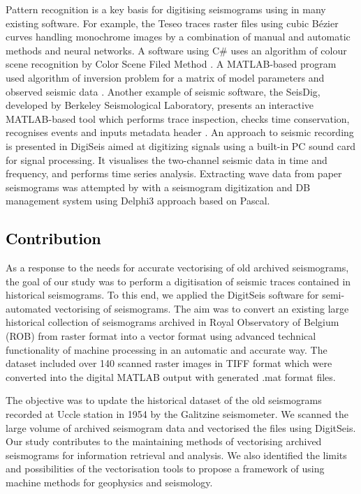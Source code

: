 \documentclass[sensors,article,accept,moreauthors,pdftex]{Definitions/mdpi}
\begin{document}
{Pattern recognition is a key basis for }digitising seismograms{ using in many existing software. }For example, the Teseo \cite{Pintoreetal2005} traces raster files using cubic Bézier curves{ handling }monochrome images by {a combination of }manual and automatic methods and neural networks. A software using C\# uses an algorithm of colour scene recognition by Color Scene Filed Method \cite{Wangetal2016}. A{ }MATLAB{-based program }used algorithm of inversion problem for a matrix of model parameters and observed seismic data \cite{XuXu}. Another example of seismic software, the SeisDig{, developed }by Berkeley Seismological Laboratory{, }presents an interactive MATLAB{-}based tool {which performs }trace inspection, checks{ }time conservation, recognises{ }events and inputs{ }metadata header \cite{BromirskiChuang2003}. An approach to seismic recording is presented in DigiSeis \cite{Khanetal2012} aimed at digitizing signals using a built-in PC sound card for signal processing. It visualises the two-channel seismic data in time and frequency, and{ performs }time series analysis. Extracting wave data from paper seismograms was attempted by \cite{Liuetal2001} with a seismogram digitization and DB management system using Delphi3 {approach }based on Pascal{.}

\subsection{\textcolor{black}{Contribution}}
{As a response to the needs for accurate vectorising of old archived seismograms, the} goal of our study was to perform a{ }digitisation of seismic traces contained in historical seismograms. To {this end, we applied} the DigitSeis software \cite{BogiatzisIshii2016} for{ }semi-automated vectorising of seismograms. The aim was to convert an existing large historical {collection }of seismograms{ } {archived in Royal Observatory of Belgium (ROB) } from {raster }format into a {vector format }using advanced technical functionality of machine processing {in an }automatic{ and accurate way. The dataset included} over 140 scanned raster images in TIFF format {which were converted} into the digital MATLAB output with generated .mat format files.

{The objective was to update }the historical dataset of {the }old seismograms recorded at Uccle station {in }1954 by {the }Galitzine seismometer. {We scanned the large volume of archived seismogram }data {and vectorised the files using} DigitSeis. Our study contributes to the {maintaining methods of vectorising }archived{ }seismograms {for information retrieval and analysis}. We also {identified }the limits {and possibilities }of the {vectorisation }tools to {propose a framework of using machine methods }for {geophysics and seismology}. 
\end{document}
